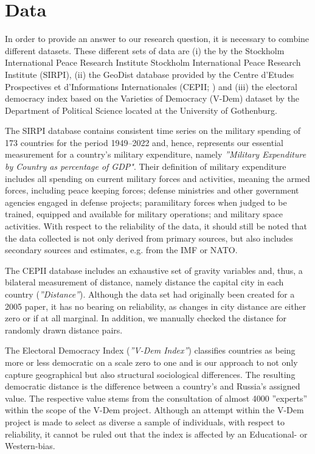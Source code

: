 \documentclass[12pt,a4paper]{article}
\begin{document}
\section{Data}
In order to provide an answer to our research question, it is necessary to combine different datasets. These different sets of data are (i) the \citet{SIRPI} by the Stockholm International Peace Research Institute Stockholm International Peace Research Institute (SIRPI), (ii) the GeoDist database provided by the Centre d'Etudes Prospectives et d'Informations Internationales (CEPII; \citealp{mayer2011}) and (iii) the electoral democracy index based on the Varieties of Democracy (V-Dem) dataset \citep{VDEM} by the Department of Political Science located at the University of Gothenburg. 

The SIRPI database contains consistent time series on the military spending of 173  countries for the period 1949–2022 and, hence, represents our essential measurement for a country's military expenditure, namely \textit{''Military Expenditure by Country as percentage of GDP"}. Their definition of military expenditure includes all spending on current military forces and activities, meaning the armed forces, including peace keeping forces; defense ministries and other government agencies engaged in defense projects; paramilitary forces when judged to be trained, equipped and available for military operations; and military space activities. With respect to the reliability of the data, it should still be noted that the data collected is not only derived from primary sources, but also includes secondary sources and estimates, e.g. from the IMF or NATO.
 
\pagebreak
The CEPII database includes an exhaustive set of gravity variables and, thus, a bilateral measurement of distance, namely distance the capital city in each country (\textit{''Distance''}). Although the data set had originally been created for a 2005 paper, it has no bearing on reliability, as changes in city distance are either zero or if at all marginal. In addition, we manually checked the distance for randomly drawn distance pairs.

The Electoral Democracy Index (\textit{''V-Dem Index''}) classifies countries as being more or less democratic  on a scale zero to one and is our approach to not only capture geographical but also structural sociological differences. The resulting democratic distance is the difference between a country's and Russia's assigned value. The respective value stems from the consultation of almost 4000 ''experts'' within the scope of the V-Dem project. Although an attempt within the V-Dem project is made to select as diverse a sample of individuals, with respect to reliability, it cannot be ruled out that the index is affected by an Educational- or Western-bias.
\end{document}
